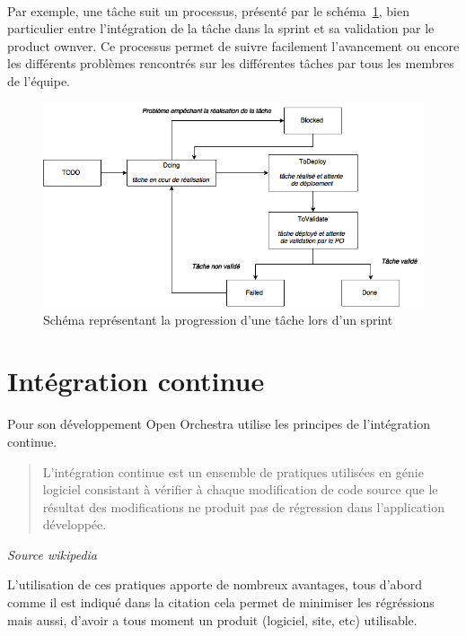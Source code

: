 \paragraph{}
Par exemple, une tâche suit un processus, présenté par le schéma~\ref{tache_trello}, bien particulier entre l'intégration de la tâche dans la sprint et sa validation par le product ownver. Ce processus permet de suivre facilement l'avancement ou encore les différents problèmes rencontrés sur les différentes tâches par tous les membres de l'équipe.

\begin{figure}[H]
  \begin{center}
    \includegraphics[scale=0.70]{images/tache_trello}
  \end{center}
  \caption{Schéma représentant la progression d'une tâche lors d'un sprint}
  \label{tache_trello}
\end{figure}
\section{Intégration continue}
Pour son développement Open Orchestra utilise les principes de l'intégration continue. 
\newline
\begin{quotation}
L'intégration continue est un ensemble de pratiques utilisées en génie logiciel consistant à vérifier à chaque modification de code source que le résultat des modifications ne produit pas de régression dans l'application développée.
\end{quotation}
\textit{Source wikipedia}

L'utilisation de ces pratiques apporte de nombreux avantages, tous d'abord comme il est indiqué dans la citation cela permet de minimiser les régréssions mais aussi, d'avoir a tous moment un produit (logiciel, site, etc) utilisable.

